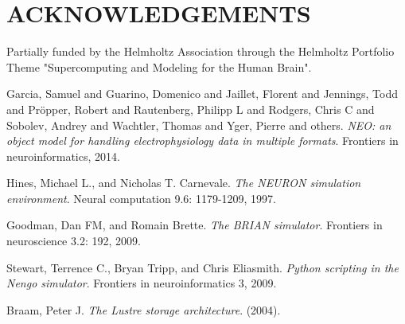 \documentclass[]{YIC2015}
\begin{document}
\section*{ACKNOWLEDGEMENTS}
Partially funded by the Helmholtz Association through the Helmholtz Portfolio Theme "Supercomputing and Modeling for the Human Brain".


\begin{thebibliography}{99}




Garcia, Samuel and Guarino, Domenico and Jaillet, Florent and Jennings, Todd and Pr{\"o}pper, Robert and Rautenberg, Philipp L and Rodgers, Chris C and Sobolev, Andrey and Wachtler, Thomas and Yger, Pierre and others.
\textit{NEO: an object model for handling electrophysiology data in multiple formats}.
Frontiers in neuroinformatics, 2014.

Hines, Michael L., and Nicholas T. Carnevale. \textit{The NEURON simulation environment}. Neural computation 9.6: 1179-1209, 1997.

Goodman, Dan FM, and Romain Brette. \textit{The BRIAN simulator}. Frontiers in neuroscience 3.2: 192, 2009.

Stewart, Terrence C., Bryan Tripp, and Chris Eliasmith. \textit{Python scripting in the Nengo simulator}. Frontiers in neuroinformatics 3, 2009.

Braam, Peter J. \textit{The Lustre storage architecture}. (2004).



\end{thebibliography}
\end{document}
